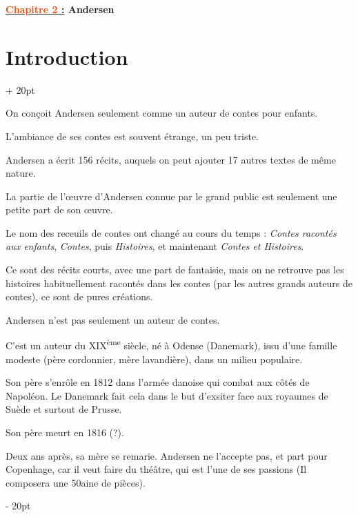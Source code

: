 \documentclass[a4paper, 12pt, twoside]{article}
\renewcommand{\emph}{\textcolor{ff4500}}
\newcommand{\ind}[1][20pt]{\advance\leftskip + #1}
\newcommand{\deind}[1][20pt]{\advance\leftskip - #1}
\newenvironment{indt}[2][20pt]{#2 \par \ind[#1]}{\par \deind} %
\newcommand{\thetitle}[2]{\begin{center}\textbf{{\LARGE \underline{\emph{#1} :}} {\Large #2}}\end{center}}
\begin{document}
    
    \thetitle{Chapitre 2}{Andersen}
    
    \tableofcontents
    \newpage
    
    
    \begin{indt}{\section*{Introduction}}
        
        
        On conçoit Andersen seulement comme un auteur de contes pour enfants.
        
        L'ambiance de ses contes est souvent étrange, un peu triste.
        
        Andersen a écrit 156 récits, auquels on peut ajouter 17 autres textes de même nature.
        
        La partie de l'\oe uvre d'Andersen connue par le grand public est seulement une petite part de son \oe uvre.
        
        Le nom des receuils de contes ont changé au cours du temps : \textit{Contes racontés aux enfants}, \textit{Contes}, puis \textit{Histoires}, et maintenant \textit{Contes et Histoires}.
        
        Ce sont des récits courts, avec une part de fantaisie, mais on ne retrouve pas les histoires habituellement racontés dans les contes (par les autres grands auteurs de contes), ce sont de pures créations.
        
        Andersen n'est pas seulement un auteur de contes.
        
        \vspace{12pt}
        
        C'est un auteur du XIX\textsuperscript{ème} siècle, né à Odense (Danemark), issu d'une famille modeste (père cordonnier, mère lavandière), dans un milieu populaire.
        
        Son père s'enrôle en 1812 dans l'armée danoise qui combat aux côtés de Napoléon. Le Danemark fait cela dans le but d'exsiter face aux royaumes de Suède et surtout de Prusse.
        
        Son père meurt en 1816 (?).
        
        Deux ans après, sa mère se remarie. Andersen ne l'accepte pas, et part pour Copenhage, car il veut faire du théâtre, qui est l'une de ses passions (Il composera une 50aine de pièces).
        

\end{indt}
\end{document}
